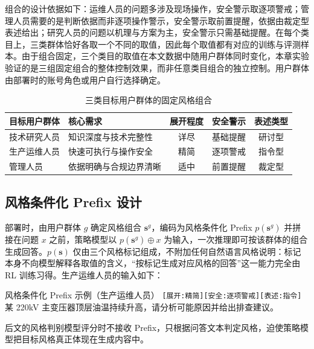 \documentclass[fontset=fandol,type=master,campus=shenzhen,etitleauto=true]{hithesisbook}
\begin{document}
组合的设计依据如下：运维人员的问题多涉及现场操作，安全警示取逐项警戒；管理人员需要的是判断依据而非逐项操作警示，安全警示取前置提醒，依据由裁定型表述给出；研究人员的问题以机理与方案为主，安全警示只需基础提醒。在每个类目上，三类群体恰好各取一个不同的取值，因此每个取值都有对应的训练与评测样本。由于组合固定，三个类目的取值在本文数据中随用户群体同时变化，本章实验验证的是三组固定组合的整体控制效果，而非任意类目组合的独立控制。用户群体由部署时的账号角色或用户自行选择确定。

\begin{table}[htbp]
\centering
\caption{三类目标用户群体的固定风格组合}
\label{tab:scene-intensity-map}
\small
\setlength{\tabcolsep}{8pt}
\renewcommand{\arraystretch}{1.15}
\begin{tabular}{l l c c c}
\toprule
\textbf{目标用户群体} & \textbf{核心需求} & \textbf{展开程度} & \textbf{安全警示} & \textbf{表述类型} \\
\midrule
技术研究人员 & 知识深度与技术完整性 & 详尽 & 基础提醒 & 研讨型 \\
生产运维人员 & 快速可执行与操作安全 & 精简 & 逐项警戒 & 指令型 \\
管理人员 & 依据明确与合规边界清晰 & 适中 & 前置提醒 & 裁定型 \\
\bottomrule
\end{tabular}
\end{table}

\subsection{风格条件化 Prefix 设计}\label{ux5f3aux5ea6ux6761ux4ef6ux5316-prefix-ux8bbeux8ba1}

部署时，由用户群体 $g$ 确定风格组合 $\mathbf{s}^{g}$，编码为风格条件化 Prefix $p(\mathbf{s}^{g})$ 并拼接在问题 $x$ 之前，策略模型以 $p(\mathbf{s}^{g}) \oplus x$ 为输入，一次推理即可按该群体的组合生成回答。$p(\mathbf{s})$ 仅由三个风格标记组成，不附加任何自然语言风格说明：标记本身不向模型解释各取值的含义，“按标记生成对应风格的回答”这一能力完全由 RL 训练习得。生产运维人员的输入如下：

\begin{promptbox}{风格条件化 Prefix 示例（生产运维人员）}
\texttt{[展开:精简][安全:逐项警戒][表述:指令]}\quad 某 220kV 主变压器顶层油温持续升高，请分析可能原因并给出排查建议。
\end{promptbox}

后文的风格判别模型评分时不接收 Prefix，只根据问答文本判定风格，迫使策略模型把目标风格真正体现在生成内容中。
\end{document}
